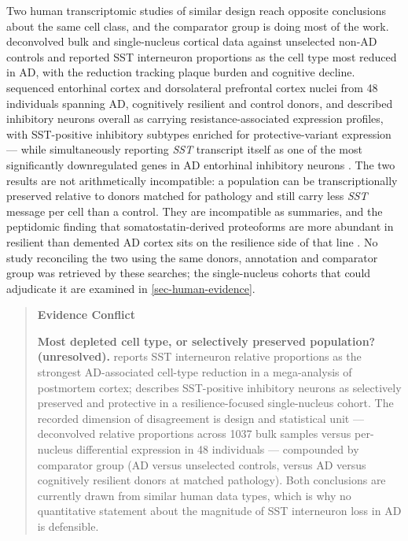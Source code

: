 \documentclass[11pt]{article}
\begin{document}
Two human transcriptomic studies of similar design reach opposite conclusions about the same cell class, and the comparator group is doing most of the work. \citet{Consens2022b} deconvolved bulk and single-nucleus cortical data against unselected non-AD controls and reported SST interneuron proportions as the cell type most reduced in AD, with the reduction tracking plaque burden and cognitive decline. \citet{Castanho2025b} sequenced entorhinal cortex and dorsolateral prefrontal cortex nuclei from 48 individuals spanning AD, cognitively resilient and control donors, and described inhibitory neurons overall as carrying resistance-associated expression profiles, with SST-positive inhibitory subtypes enriched for protective-variant expression --- while simultaneously reporting \emph{SST} transcript itself as one of the most significantly downregulated genes in AD entorhinal inhibitory neurons \citep{Castanho2025a}. The two results are not arithmetically incompatible: a population can be transcriptionally preserved relative to donors matched for pathology and still carry less \emph{SST} message per cell than a control. They are incompatible as summaries, and the peptidomic finding that somatostatin-derived proteoforms are more abundant in resilient than demented AD cortex sits on the resilience side of that line \citep{Morgan2024b}. No study reconciling the two using the same donors, annotation and comparator group was retrieved by these searches; the single-nucleus cohorts that could adjudicate it are examined in \ref{sec-human-evidence}.

\begin{quote}
\noindent\textbf{Evidence Conflict}\par
\textbf{Most depleted cell type, or selectively preserved population? (unresolved).} \citet{Consens2022b} reports SST interneuron relative proportions as the strongest AD-associated cell-type reduction in a mega-analysis of postmortem cortex; \citet{Castanho2025b} describes SST-positive inhibitory neurons as selectively preserved and protective in a resilience-focused single-nucleus cohort. The recorded dimension of disagreement is design and statistical unit --- deconvolved relative proportions across 1037 bulk samples versus per-nucleus differential expression in 48 individuals --- compounded by comparator group (AD versus unselected controls, versus AD versus cognitively resilient donors at matched pathology). Both conclusions are currently drawn from similar human data types, which is why no quantitative statement about the magnitude of SST interneuron loss in AD is defensible.

\end{quote}
\end{document}
